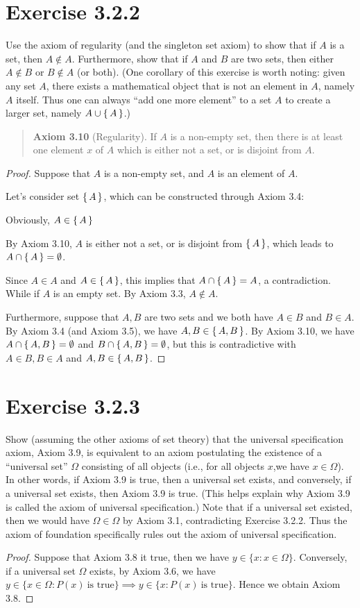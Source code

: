 \documentclass{article}
\begin{document}
\section{Exercise 3.2.2}
Use the axiom of regularity (and the singleton set axiom) to show that if $A$ is a set, then $A\notin A$. Furthermore, show that if $A$ and $B$ are two sets, then either $A\notin B$ or $B\notin A$ (or both).
(One corollary of this exercise is worth noting: given any set $A$, there exists a mathematical object
that is not an element in $A$, namely $A$ itself. Thus one can always “add one more element” to a set
$A$ to create a larger set, namely $A \cup\set{A}$.)
\begin{quotation}

    \textbf{Axiom 3.10} (Regularity). If $A$ is a non-empty set, then there is at least one element
    $x$ of $A$ which is either not a set, or is disjoint from $A$.
\end{quotation}
\begin{proof}
    Suppose that $A$ is a non-empty set, and $A$ is an element of $A$.

    Let's consider set $\set{A}$, which can be constructed through Axiom 3.4:

    Obviously, $A\in\set{A}$

    By Axiom 3.10, $A$ is either not a set, or is disjoint from $\set{A}$, which leads to $A\cap\set{A}=\emptyset$.

    Since $A\in A$ and $A\in\set{A}$, this implies that $A\cap\set{A}=A$, a contradiction. While if $A$ is an empty set. By Axiom 3.3, $A\notin A$.

    Furthermore, suppose that $A,B$ are two sets and we both have $A\in B$ and $B\in A$. By Axiom 3.4 (and Axiom 3.5), we have $A,B\in\set{A,B}$. By Axiom 3.10, we have $A\cap\set{A,B}=\emptyset$ and $B\cap\set{A,B}=\emptyset$, but this is contradictive with $A\in B,B\in A$ and $A,B\in\set{A,B}$.
\end{proof}

\section{Exercise 3.2.3}
Show (assuming the other axioms of set theory) that the universal specification
axiom, Axiom 3.9, is equivalent to an axiom postulating the existence of a “universal set” $\Omega$
consisting of all objects (i.e., for all objects $x$,we have $x \in \Omega$). In other words, if Axiom 3.9 is true,
then a universal set exists, and conversely, if a universal set exists, then Axiom 3.9 is true. (This
helps explain why Axiom 3.9 is called the axiom of universal specification.) Note that if a universal
set
existed, then we would have $\Omega\in\Omega$ by Axiom 3.1, contradicting Exercise 3.2.2. Thus the
axiom of foundation specifically rules out the axiom of universal specification.
\begin{proof}
    Suppose that Axiom 3.8 it true, then we have
    $y\in\{x:x\in\Omega\}$.
    Conversely, if a universal set $\Omega$ exists, by Axiom 3.6, we have
    $y\in\{x\in\Omega:P(x)\ \textrm{is true}\}\implies y\in\{x:P(x)\ \textrm{is true}\}$.
    Hence we obtain Axiom 3.8.
\end{proof}
\end{document}
